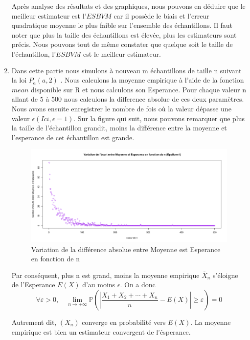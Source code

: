 \documentclass[12pt]{article}
\begin{document}
\begin{enumerate}
Apr\`{e}s analyse des r\'{e}sultats et des graphiques, nous pouvons en d\'{e}duire que le meilleur estimateur est l'$ESBVM$ car il poss\`{e}de  le biais et l'erreur quadratique moyenne le plus faible sur l'ensemble des \'{e}chantillons. Il faut noter que plus la taille des \'{e}chantillons est \'{e}lev\'{e}e, plus les estimateurs sont pr\'{e}cis. Nous pouvons tout de m\^{e}me constater que quelque soit le taille de l'\'{e}chantillon, l'$ESBVM$ est le meilleur estimateur.
\\
\item
Dans cette partie nous simulons \`{a} nouveau m \'{e}chantillons de taille n suivant la loi $P_a(a,2)$ . Nous calculons la moyenne empirique \`{a}  l'aide de la fonction $mean$ disponible sur R et nous calculons son Esperance. Pour chaque valeur n allant de 5 \`{a}  500 nous calculons la difference absolue de ces deux param\`{e}tres. Nous avons ensuite enregistrer le nombre de fois o\`{u} la valeur d\'{e}passe une valeur $\epsilon (Ici, \epsilon = 1 )$. Sur la figure qui suit, nous pouvons remarquer que plus la taille de  l'\'{e}chantillon grandit, moins la diff\'{e}rence entre la moyenne et l'esperance de cet \'{e}chantillon est grande.
\\
\begin{figure}[!h]
\label{graphe2}
\centering
\includegraphics[width=1.0\textwidth]{figures/GraphP2Q4.pdf}
\caption{Variation de la diff\'{e}rence absolue entre Moyenne est Esperance en fonction de n }
\end{figure}


Par cons\'{e}quent, plus n est grand, moins la moyenne empirique $\bar X_n$  s'\'{e}loigne de l'Esperance $E(X)$ d'au moins $\epsilon$.
On a donc $$\forall\varepsilon>0,\quad \lim_{n \to +\infty} \mathbb{P}\left(\left|\frac{X_1+X_2+\cdots+X_n}{n} -E(X)\right| \geqslant \varepsilon\right) = 0 $$

Autrement dit, $(X_n)$ converge en probabilit\'{e} vers $E(X)$. La moyenne empirique est bien un estimateur convergent de l'\'{e}sperance.


\end{enumerate}
\end{document}
